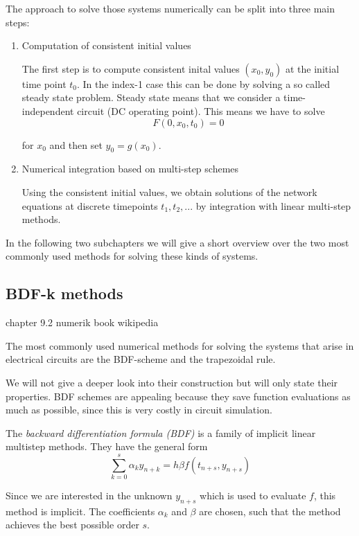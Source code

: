 The approach to solve those systems numerically can be split into three main steps:
\begin{enumerate}
	\item Computation of consistent initial values
	
	The first step is to compute consistent inital values $(x_0, y_0)$ at the initial time point $t_0$. In the index-1 case this can be done by solving a so called steady state problem. Steady state means that we consider a time-independent circuit (DC operating point). This means we have to solve
	\begin{displaymath}
		F(0,x_0,t_0) = 0
	\end{displaymath}
	
	for $x_0$ and then set $y_0 = g(x_0)$.
	
	\item Numerical integration based on multi-step schemes
	
	Using the consistent initial values, we obtain solutions of the network equations at discrete timepoints $t_1, t_2, ...$ by integration with linear multi-step methods.
\end{enumerate}

In the following two subchapters we will give a short overview over the two most commonly used methods for solving these kinds of systems.

\subsection{BDF-k methods}
	\label{ch:BDf-k methods}
	chapter 9.2 numerik book
	wikipedia
	
	The most commonly used numerical methods for solving the systems that arise in electrical circuits are the BDF-scheme and the trapezoidal rule. 
	
	We will not give a deeper look into their construction but will only state their properties. BDF schemes are appealing because they save function evaluations as much as possible, since this is very costly in circuit simulation.
	
	The \emph{backward differentiation formula (BDF)} is a family of implicit linear multistep methods. They have the general form
	\begin{equation}
		\sum_{k=0}^{s} \alpha_k y_{n+k} = h \beta f(t_{n+s}, y_{n+s})
	\end{equation}

	Since we are interested in the unknown $y_{n+s}$ which is used to evaluate $f$, this method is implicit. The coefficients $\alpha_k$ and $\beta$ are chosen, such that the method achieves the best possible order $s$.
	
